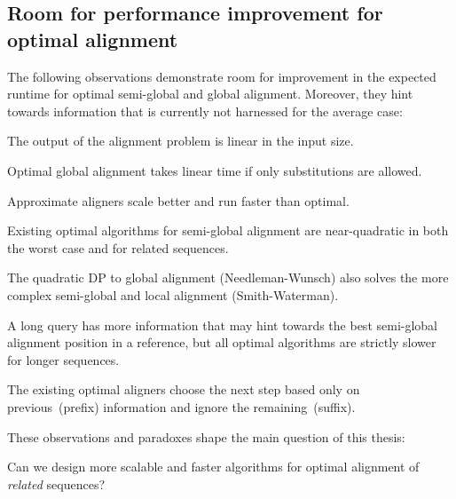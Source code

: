 \subsection*{Room for performance improvement for optimal alignment}

The following observations demonstrate room for improvement in the expected
runtime for optimal semi-global and global alignment. Moreover, they hint towards
information that is currently not harnessed for the average case:

\begin{observation}
    The output of the alignment problem is linear in the input size.
\end{observation}

\begin{observation}
    Optimal global alignment takes linear time if only substitutions are allowed.
\end{observation}

\begin{observation}
    Approximate aligners scale better and run faster than optimal.
\end{observation}

\begin{observation}
    Existing optimal algorithms for semi-global alignment are near-quadratic in
    both the worst case and for related sequences.
\end{observation}

\begin{observation}
    The quadratic DP to global alignment (Needleman-Wunsch) also solves the more
    complex semi-global and local alignment (Smith-Waterman).
\end{observation}

\begin{paradox}
    A long query has more information that may hint towards the best semi-global
    alignment position in a reference, but all optimal algorithms are strictly
    slower for longer sequences.
\end{paradox}

\begin{observation}
    The existing optimal aligners choose the next step based only on
    previous~(prefix) information and ignore the remaining~(suffix).
\end{observation}

These observations and paradoxes shape the main question of this thesis:

\begin{problem}
    Can we design more scalable and faster algorithms for optimal alignment of
    \emph{related} sequences?
\end{problem}

